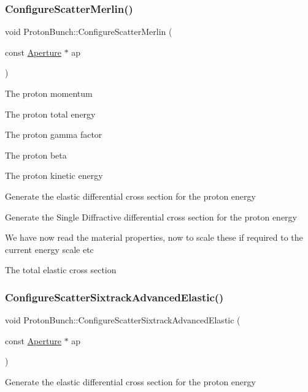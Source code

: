 \subsubsection{\texorpdfstring{Configure\+Scatter\+Merlin()}{ConfigureScatterMerlin()}}
{\footnotesize\ttfamily void Proton\+Bunch\+::\+Configure\+Scatter\+Merlin (\begin{DoxyParamCaption}\item[{const \hyperlink{classAperture}{Aperture} $\ast$}]{ap }\end{DoxyParamCaption})}

The proton momentum

The proton total energy

The proton gamma factor

The proton beta

The proton kinetic energy

Generate the elastic differential cross section for the proton energy

Generate the Single Diffractive differential cross section for the proton energy

We have now read the material properties, now to scale these if required to the current energy scale etc

The total elastic cross section\mbox{\label{classParticleTracking_1_1ProtonBunch_a00346d5259395ac42034ab42f1f60a46}} 
\subsubsection{\texorpdfstring{Configure\+Scatter\+Sixtrack\+Advanced\+Elastic()}{ConfigureScatterSixtrackAdvancedElastic()}}
{\footnotesize\ttfamily void Proton\+Bunch\+::\+Configure\+Scatter\+Sixtrack\+Advanced\+Elastic (\begin{DoxyParamCaption}\item[{const \hyperlink{classAperture}{Aperture} $\ast$}]{ap }\end{DoxyParamCaption})}

Generate the elastic differential cross section for the proton energy

